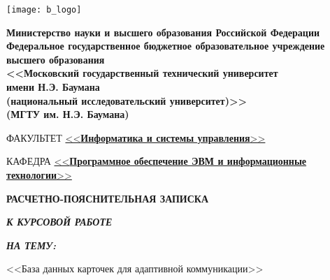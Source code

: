 \begin{titlepage}
	\noindent\begin{minipage}{0.05\textwidth}
		\texttt{[image: b\_logo]}
	\end{minipage}
	\hfill
	\begin{minipage}{0.85\textwidth}\raggedleft
		\begin{center}
			\fontsize{12pt}{0.3\baselineskip}\selectfont \textbf{Министерство науки и высшего образования Российской Федерации \\ Федеральное государственное бюджетное образовательное учреждение \\ высшего образования \\ <<Московский государственный технический университет \\ имени Н.Э. Баумана \\ (национальный исследовательский университет)>> \\ (МГТУ им. Н.Э. Баумана)}
		\end{center}
	\end{minipage}
	
	\begin{center}
		\fontsize{12pt}{0.1\baselineskip}\selectfont
		\noindent\makebox[\linewidth]{\rule{\textwidth}{4pt}} \makebox[\linewidth]{\rule{\textwidth}{1pt}}
	\end{center}
	
	\begin{flushleft}
		\fontsize{12pt}{0.8\baselineskip}\selectfont 
		
		ФАКУЛЬТЕТ \uline{<<\textbf{Информатика и системы управления}>> \hfill}
		
		КАФЕДРА \uline{<<\textbf{Программное обеспечение ЭВМ и информационные технологии}>> \hfill}
	\end{flushleft}
	
	\vfill
	
	\begin{center}
		\fontsize{20pt}{\baselineskip}\selectfont
		
		\textbf{РАСЧЕТНО-ПОЯСНИТЕЛЬНАЯ ЗАПИСКА}
		
		\textbf{\textit{К КУРСОВОЙ РАБОТЕ}}
		
		\textbf{\textit{НА ТЕМУ:}}
	\end{center}
	
	\begin{center}
		\fontsize{18pt}{0.6cm}\selectfont 
		
		<<База данных карточек для адаптивной коммуникации>>
		

\end{center}
\end{titlepage}
